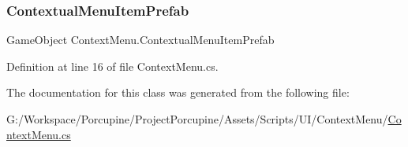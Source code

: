 \subsubsection{\texorpdfstring{Contextual\+Menu\+Item\+Prefab}{ContextualMenuItemPrefab}}
{\footnotesize\ttfamily Game\+Object Context\+Menu.\+Contextual\+Menu\+Item\+Prefab}



Definition at line 16 of file Context\+Menu.\+cs.



The documentation for this class was generated from the following file\+:\begin{DoxyCompactItemize}
\item 
G\+:/\+Workspace/\+Porcupine/\+Project\+Porcupine/\+Assets/\+Scripts/\+U\+I/\+Context\+Menu/\hyperlink{_context_menu_8cs}{Context\+Menu.\+cs}\end{DoxyCompactItemize}
